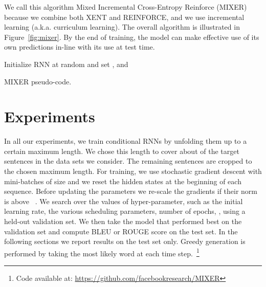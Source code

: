 \documentclass{article} \usepackage{iclr2016_conference,times}
\makeatletter
\newcommand*{\etc}{\@ifnextchar{.}{etc}{etc.\@\xspace}}
\makeatother
\begin{document}
We call this algorithm Mixed Incremental Cross-Entropy Reinforce (MIXER)
because we combine both XENT and REINFORCE, and we use incremental 
learning (a.k.a. curriculum learning). 
The overall algorithm is illustrated in Figure~\ref{fig:mixer}. 
By the end of training, the model can make effective use of its own 
predictions in-line with its use at test time.

\begin{algorithm}[t]
\footnotesize
 Initialize RNN at random and set , 
 and \; 
\caption{MIXER pseudo-code.}
 \label{alg:mixer}
\end{algorithm}
 \section{Experiments} \label{sec:experiments}
In all our experiments, we train conditional RNNs by unfolding them
up to a certain maximum length. 
We chose this length to cover about  of the target sentences in the data sets we consider.
The remaining sentences are cropped to the chosen maximum length. 
For training, we use stochastic gradient descent
with mini-batches of size  and we reset the hidden states at the
beginning of each sequence. Before updating the parameters we
re-scale the gradients if their norm is above ~\citep{mikolov-2010}.
We search over the values of hyper-parameter, such as the initial learning rate, 
the various scheduling parameters, number of epochs, \etc, using a held-out validation set. 
We then take the model that performed best on the validation set and compute BLEU or ROUGE 
score on the test set. In the following sections we report results on the test set only. 
Greedy generation is performed by taking the most likely word at each time step.~\footnote{Code available at: \url{https://github.com/facebookresearch/MIXER}} 
\end{document}
